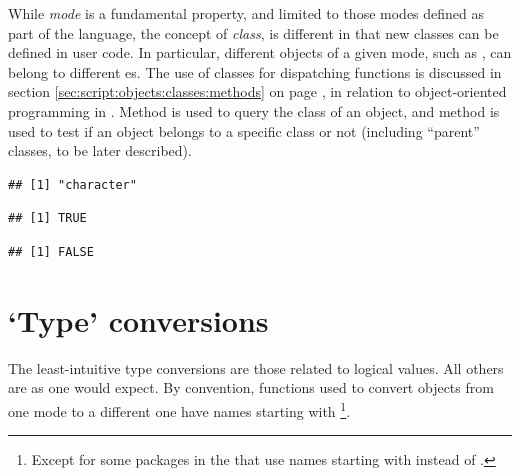 \documentclass[krantz2]{krantz}\usepackage{knitr}
\begin{document}
While \emph{mode} is a fundamental property, and limited to those modes defined as part of the \Rlang language, the concept of \emph{class}, is different in that new classes can be defined in user code. In particular, different \Rlang objects of a given mode, such as , can belong to different es. The use of classes for dispatching functions is discussed in section \ref{sec:script:objects:classes:methods} on page \pageref{sec:script:objects:classes:methods}, in relation to object-oriented programming in \Rlang. Method  is used to query the class of an object, and method  is used to test if an object belongs to a specific class or not (including ``parent'' classes, to be later described).

\begin{knitrout}\footnotesize
{}\color{fgcolor}\begin{kframe}
\begin{alltt}
\end{alltt}
\begin{verbatim}
## [1] "character"
\end{verbatim}
\begin{alltt}
 \hlstd{)}
\end{alltt}
\begin{verbatim}
## [1] TRUE
\end{verbatim}
\begin{alltt}
 \hlstd{)}
\end{alltt}
\begin{verbatim}
## [1] FALSE
\end{verbatim}
\end{kframe}
\end{knitrout}

\section{`Type' conversions}\label{sec:calc:type:conversion}
The least-intuitive type conversions are those related to logical values. All others are as one would expect. By convention, functions used to convert objects from one mode to a different one have names starting with \footnote{Except for some packages in the  that use names starting with  instead of .}.
\end{document}
